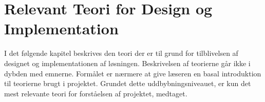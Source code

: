 \chapter{Relevant Teori for Design og Implementation}


I det følgende kapitel beskrives den teori der er til grund for tilblivelsen af designet og implementationen af løsningen. Beskrivelsen af teorierne går ikke i dybden med emnerne. Formålet er nærmere at give læseren en basal introduktion til teorierne brugt i projektet. Grundet dette uddbybningsniveauet, er kun det mest relevante teori for forståelsen af projektet, medtaget.






